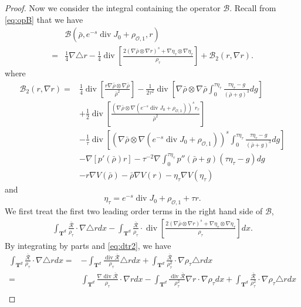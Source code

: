 \documentclass[10pt,a4paper]{amsart}
\def\T{{\mathbf T}}%
\DeclareMathOperator{\diver}{div}
\begin{document}
\begin{proof}
Now we consider the integral containing the operator $\mathcal{B}$. Recall from \eqref{eq:opB} that we have
\begin{align*}
&\mathcal{B}(\bar\rho,e^{-s}\diver J_0+\rho_{\mathcal{O},1},r)\\
=&\frac14\nabla\triangle r-\frac14\diver\left[\frac{2(\nabla\bar\rho \otimes\nabla r)^s+\nabla \eta_\tau\otimes \nabla \eta_\tau}{\rho_\tau}\right]+\mathcal{B}_2(r,\nabla r).
\end{align*}
where
\begin{equation}\label{eq:B2}
\begin{aligned}
\mathcal{B}_2(r,\nabla r)=&\frac14\diver\left[\frac{r\nabla \bar\rho\otimes\nabla \bar\rho }{\bar\rho^2}\right]-\frac{1}{2\tau^2}\diver\left[\nabla \bar\rho\otimes\nabla \bar\rho\int_0^{\tau \eta_\tau}\frac{\tau \eta_\tau-g}{(\bar\rho+g)^3}dg\right]\\
&+\frac12\diver\left[\frac{(\nabla \bar\rho\otimes\nabla(e^{-s}\diver J_0+\rho_{\mathcal{O},1}))^sr_\tau}{\bar\rho^2}\right]\\
&-\frac{1}{\tau}\diver\left[(\nabla \bar\rho\otimes\nabla(e^{-s}\diver J_0+\rho_{\mathcal{O},1}))^s\int_0^{\tau \eta_\tau}\frac{\tau \eta_\tau-g}{(\bar\rho+g)^3}dg\right]\\
&-\nabla [p'(\bar\rho)r]-\tau^{-2}\nabla\int_0^{\tau \eta_\tau} p''(\bar\rho+g)(\tau \eta_\tau-g)dg\\
&-r\nabla V(\bar\rho)-\bar\rho\nabla V(r)-\eta_\tau\nabla V(\eta_\tau)
\end{aligned}
\end{equation}
and
\[
\eta_\tau=e^{-s}\diver J_0+\rho_{\mathcal{O},1}+\tau r.
\]
We first treat the first two leading order terms in the right hand side of $\mathcal{B}$,
\begin{align*}
\int_{\T^d} \frac{\overline{\mathcal{R}}}{\rho_\tau}\cdot\nabla\triangle rdx-\int_{\T^d} \frac{\overline{\mathcal{R}}}{\rho_\tau}\cdot\diver\left[\frac{2(\nabla\bar\rho \otimes\nabla r)^s+\nabla \eta_\tau\otimes \nabla \eta_\tau}{\rho_\tau}\right]dx.
\end{align*}
By integrating by parts and \eqref{eq:dtr2}, we have
\begin{align*}
\int_{\T^d} \frac{\overline{\mathcal{R}}}{\rho_\tau}\cdot\nabla\triangle rdx=&-\int_{\T^d} \frac{\diver \overline{\mathcal{R}}}{\rho_\tau}\triangle rdx+\int_{\T^d} \frac{\overline{\mathcal{R}}}{\rho_\tau^2}\cdot\nabla\rho_\tau\triangle r dx\\
=&\int_{\T^d} \frac{\nabla\diver \overline{\mathcal{R}}}{\rho_\tau}\cdot\nabla rdx-\int_{\T^d} \frac{\diver \overline{\mathcal{R}}}{\rho_\tau^2}\nabla r\cdot\nabla\rho_\tau dx+\int_{\T^d} \frac{\overline{\mathcal{R}}}{\rho_\tau^2}\cdot\nabla\rho_\tau\triangle r  dx\\

\end{align*}
\end{proof}
\end{document}
